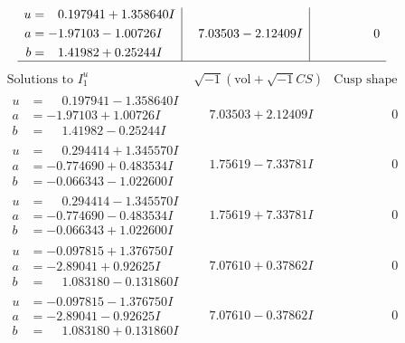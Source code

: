 \documentclass[1p]{elsarticle_modified}
\theoremstyle{definition}
\newcommand{\I}{\sqrt{-1}}
\begin{document}
$$\begin{array}{c|c|c}
\begin{aligned}
u &= \phantom{-}0.197941 + 1.358640 I \\
a &= -1.97103 - 1.00726 I \\
b &= \phantom{-}1.41982 + 0.25244 I\end{aligned}
 & \phantom{-}7.03503 - 2.12409 I & \phantom{-0.000000 } 0\\
 \hline 
 \end{array}$$\newpage$$\begin{array}{c|c|c}  
\text{Solutions to }I^u_{1}& \I (\text{vol} + \sqrt{-1}CS) & \text{Cusp shape}\\
 \hline 
\begin{aligned}
u &= \phantom{-}0.197941 - 1.358640 I \\
a &= -1.97103 + 1.00726 I \\
b &= \phantom{-}1.41982 - 0.25244 I\end{aligned}
 & \phantom{-}7.03503 + 2.12409 I & \phantom{-0.000000 } 0 \\ \hline\begin{aligned}
u &= \phantom{-}0.294414 + 1.345570 I \\
a &= -0.774690 + 0.483534 I \\
b &= -0.066343 - 1.022600 I\end{aligned}
 & \phantom{-}1.75619 - 7.33781 I & \phantom{-0.000000 } 0 \\ \hline\begin{aligned}
u &= \phantom{-}0.294414 - 1.345570 I \\
a &= -0.774690 - 0.483534 I \\
b &= -0.066343 + 1.022600 I\end{aligned}
 & \phantom{-}1.75619 + 7.33781 I & \phantom{-0.000000 } 0 \\ \hline\begin{aligned}
u &= -0.097815 + 1.376750 I \\
a &= -2.89041 + 0.92625 I \\
b &= \phantom{-}1.083180 - 0.131860 I\end{aligned}
 & \phantom{-}7.07610 + 0.37862 I & \phantom{-0.000000 } 0 \\ \hline\begin{aligned}
u &= -0.097815 - 1.376750 I \\
a &= -2.89041 - 0.92625 I \\
b &= \phantom{-}1.083180 + 0.131860 I\end{aligned}
 & \phantom{-}7.07610 - 0.37862 I & \phantom{-0.000000 } 0 \\ \hline\begin{aligned}

\end{aligned}
\end{array}$$
\end{document}
